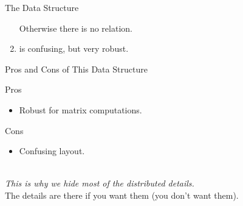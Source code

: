\begin{frame}[fragile]
\begin{block}{The  Data Structure}
\begin{enumerate}
Otherwise there is no relation.
        \item {} is confusing, but very robust.
    \end{enumerate}
  \end{block}
\end{frame}












\begin{frame}
  \begin{block}{Pros and Cons of This Data Structure}\pause
  \begin{center}
    \begin{minipage}[t]{.45\textwidth}
      \begin{center}
      \begin{block}{Pros}
	\begin{itemize}
	\item Robust for matrix computations.
	\end{itemize}
      \end{block}
      \end{center}
    \end{minipage}\hspace{.5cm}
    \begin{minipage}[t]{.45\textwidth}
      \begin{center}
      \begin{block}{Cons}
	\begin{itemize}
	  \item Confusing layout.
	\end{itemize}
      \end{block}
      \end{center}
    \end{minipage}
    \\[.6cm]
    \emph{This is why we hide most of the distributed details.}
    \\[.4cm]
    The details are there if you want them (you don't want them).
  \end{center}
  \end{block}
\end{frame}


